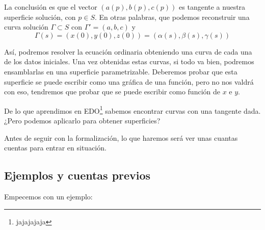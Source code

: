 	La conclusión es que el vector $(a(p),b(p),c(p))$ es tangente a nuestra superficie solución, con $p ∈ S$. En otras palabras, que podemos reconstruir una curva solución $\Gamma ⊂ S$ con $\Gamma' = (a,b,c)$ y
	$$\Gamma(s) = (x(0),y(0),z(0)) = (\alpha(s),\beta(s),\gamma(s))$$

	Así, podremos resolver la ecuación ordinaria obteniendo una curva de cada una de los datos iniciales. Una vez obtenidas estas curvas, si todo va bien, podremos ensamblarlas en una superficie parametrizable. Deberemos probar que esta superficie se puede escribir como una gráfica de una función, pero no nos valdrá con eso, tendremos que probar que se puede escribir como función de $x$ e $y$.

	De lo que aprendimos en EDO\footnote{jajajajaja} sabemos encontrar curvas con una tangente dada. ¿Pero podemos aplicarlo para obtener superficies?

	Antes de seguir con la formalización, lo que haremos será ver unas cuantas cuentas para entrar en situación.

	\subsection{Ejemplos y cuentas previos}

	Empecemos con un ejemplo:

